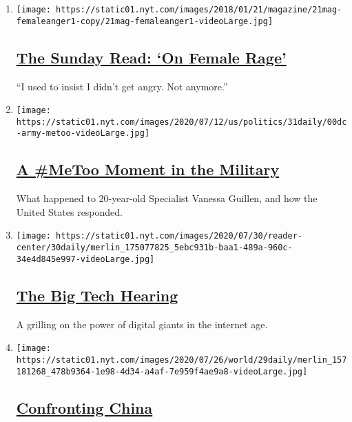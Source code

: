 \begin{enumerate}
\def\labelenumi{\arabic{enumi}.}
\item
  \texttt{[image: https://static01.nyt.com/images/2018/01/21/magazine/21mag-femaleanger1-copy/21mag-femaleanger1-videoLarge.jpg]}

  \hypertarget{the-sunday-read-on-female-rage}{%
  \subsection{\texorpdfstring{\href{/2020/08/02/podcasts/the-daily/on-female-rage.html}{The
  Sunday Read: `On Female
  Rage'}}{The Sunday Read: `On Female Rage'}}\label{the-sunday-read-on-female-rage}}

  ``I used to insist I didn't get angry. Not anymore.''
\item
  \texttt{[image: https://static01.nyt.com/images/2020/07/12/us/politics/31daily/00dc-army-metoo-videoLarge.jpg]}

  \hypertarget{a-metoo-moment-in-the-military}{%
  \subsection{\texorpdfstring{\href{/2020/07/31/podcasts/the-daily/vanessa-guillen-military-metoo.html}{A
  \#MeToo Moment in the
  Military}}{A \#MeToo Moment in the Military}}\label{a-metoo-moment-in-the-military}}

  What happened to 20-year-old Specialist Vanessa Guillen, and how the
  United States responded.
\item
  \texttt{[image: https://static01.nyt.com/images/2020/07/30/reader-center/30daily/merlin\_175077825\_5ebc931b-baa1-489a-960c-34e4d845e997-videoLarge.jpg]}

  \hypertarget{the-big-tech-hearing}{%
  \subsection{\texorpdfstring{\href{/2020/07/30/podcasts/the-daily/congress-facebook-amazon-google-apple.html}{The
  Big Tech Hearing}}{The Big Tech Hearing}}\label{the-big-tech-hearing}}

  A grilling on the power of digital giants in the internet age.
\item
  \texttt{[image: https://static01.nyt.com/images/2020/07/26/world/29daily/merlin\_157181268\_478b9364-1e98-4d34-a4af-7e959f4ae9a8-videoLarge.jpg]}

  \hypertarget{confronting-china}{%
  \subsection{\texorpdfstring{\href{/2020/07/29/podcasts/the-daily/china-trump-foreign-policy.html}{Confronting
  China}}{Confronting China}}\label{confronting-china}}


\end{enumerate}
